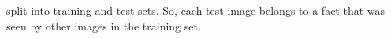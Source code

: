 \documentclass[runningheads]{llncs}
\begin{document}
split into training and test sets.
So, each test image belongs to a fact that was seen by other images in the training set. %
\end{document}
